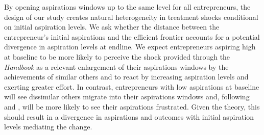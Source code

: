\documentclass[11.5pt]{article}
\begin{document}
By opening aspirations windows up to the same level for all entrepreneurs, the design of our study creates natural heterogeneity in treatment shocks conditional on initial aspiration levels. We ask whether the distance between the entrepreneur's initial aspirations and the efficient frontier accounts for a potential divergence in aspiration levels at endline. We expect entrepreneurs aspiring high at baseline to be more likely to perceive the shock provided through the \emph{Handbook} as a relevant enlargement of their aspirations windows by the achievements of similar others and to react by increasing aspiration levels and exerting greater effort. In contrast, entrepreneurs with low aspirations at baseline will see dissimilar others migrate into their aspirations windows and, following \citet{Ray2006} and \citet{Genicot2017}, will be more likely to see their aspirations frustrated. Given the theory, this should result in a divergence in aspirations and outcomes with initial aspiration levels mediating the change. %

\end{document}
